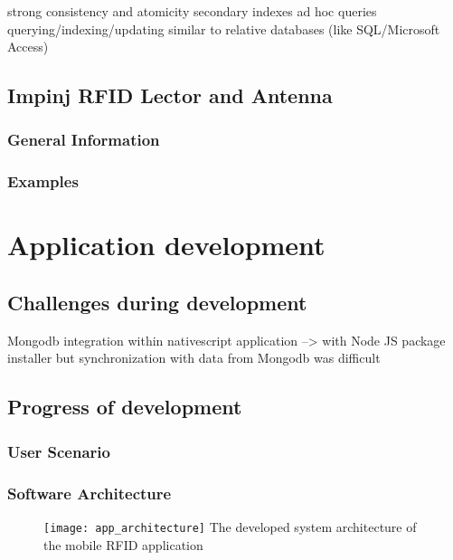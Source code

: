 strong consistency and atomicity
secondary indexes 
ad hoc queries
querying/indexing/updating similar to relative databases (like SQL/Microsoft Access)

\subsection{Impinj RFID Lector and Antenna}

\subsubsection{General Information}

\subsubsection{Examples}

%
%
\section{Application development}

\subsection{Challenges during development}

Mongodb integration within nativescript application 
--> with Node JS package installer 
but synchronization with data from Mongodb was difficult

\subsection{Progress of development}

\subsubsection{User Scenario}

\subsubsection{Software Architecture}

\begin{figure}
\centering
\texttt{[image: app\_architecture]} The developed system architecture of the mobile RFID application
\caption{\label{fig:apparchitecture}} 
\end{figure}

